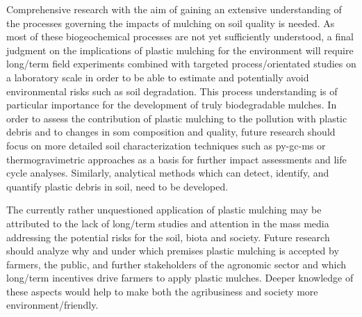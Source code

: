 Comprehensive research with the aim of gaining an extensive understanding of the processes governing the impacts of mulching on soil quality is needed. As most of these biogeochemical processes are not yet sufficiently understood, a final judgment on the implications of plastic mulching for the environment will require long\-/term field experiments combined with targeted process\-/orientated studies on a laboratory scale in order to be able to estimate and potentially avoid environmental risks such as soil degradation. This process understanding is of particular importance for the development of truly biodegradable mulches. In order to assess the contribution of plastic mulching to the pollution with plastic debris and to changes in \ac{som} composition and quality, future research should focus on more detailed soil characterization techniques such as \ac{py-gc-ms} or thermogravimetric approaches as a basis for further impact assessments and life cycle analyses. Similarly, analytical methods which can detect, identify, and quantify plastic debris in soil, need to be developed.

The currently rather unquestioned application of plastic mulching may be attributed to the lack of long\-/term studies and attention in the mass media addressing the potential risks for the soil, biota and society. Future research should analyze why and under which premises plastic mulching is accepted by farmers, the public, and further stakeholders of the agronomic sector and which long\-/term incentives drive farmers to apply plastic mulches. Deeper knowledge of these aspects would help to make both the agribusiness and society more environment\-/friendly.
